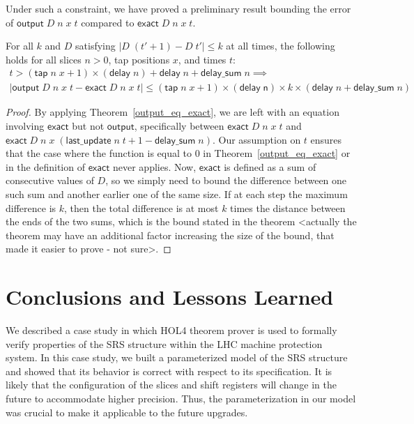 \documentclass{llncs}
\begin{document}
Under such a constraint, we have proved a preliminary result bounding the error of $\mathsf{output}\;D\;n\;x\;t$ compared to $\mathsf{exact}\;D\;n\;x\;t$.
\begin{theorem}\label{max_error}
For all $k$ and $D$ satisfying $|D\;(t'+1)-D\;t'|\leq k$ at all times, the following holds for all slices $n>0$, tap positions $x$, and times $t$:
\begin{multline*}
t>(\mathsf{tap}\;n\;x+1)\times(\mathsf{delay}\;n)+\mathsf{delay}\;n+\mathsf{delay\_sum}\;n\implies\\
|\mathsf{output}\;D\;n\;x\;t-\mathsf{exact}\;D\;n\;x\;t|\leq(\mathsf{tap}\;n\;x+1)\times(\mathsf{delay\;n})\times k\times(\mathsf{delay}\;n+\mathsf{delay\_sum}\;n)
\end{multline*}
\end{theorem}
\begin{proof}
By applying Theorem~\ref{output_eq_exact}, we are left with an equation involving $\mathsf{exact}$ but not $\mathsf{output}$, specifically between $\mathsf{exact}\;D\;n\;x\;t$ and $\mathsf{exact}\;D\;n\;x\;(\mathsf{last\_update}\;n\;t+1-\mathsf{delay\_sum}\;n)$.
Our assumption on $t$ ensures that the case where the function is equal to $0$ in Theorem~\ref{output_eq_exact} or in the definition of $\mathsf{exact}$ never applies.
Now, $\mathsf{exact}$ is defined as a sum of consecutive values of $D$, so we simply need to bound the difference between one such sum and another earlier one of the same size.
If at each step the maximum difference is $k$, then the total difference is at most $k$ times the distance between the ends of the two sums, which is the bound stated in the theorem <actually the theorem may have an additional factor increasing the size of the bound, that made it easier to prove - not sure>.
\end{proof}


\section{Conclusions and Lessons Learned}
\label{sec-conclusions}

We described a case study in which HOL4 theorem prover is used to formally verify properties of the SRS structure within the LHC machine protection system.
In this case study, we built a parameterized model of the SRS structure and showed that its behavior is correct with respect to its specification.
It is likely that the configuration of the slices and shift registers will change in the future to accommodate higher precision.
Thus, the parameterization in our model was crucial to make it applicable to the future upgrades.
\end{document}

